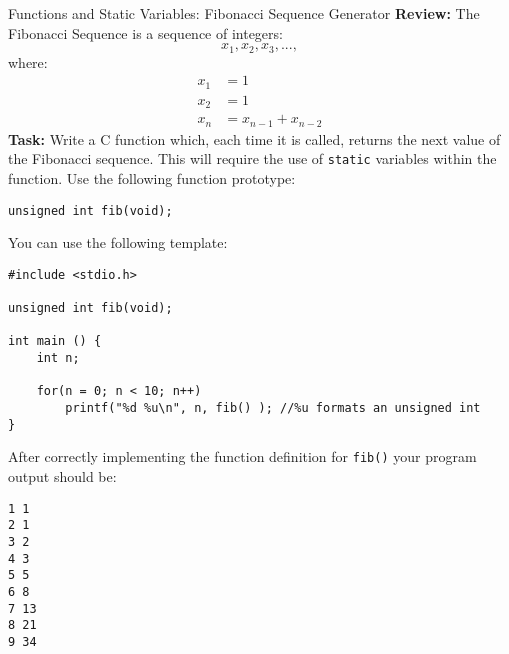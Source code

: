 \documentclass{lab}
\begin{document}
\pagebreak
\begin{task}{Functions and Static Variables: Fibonacci Sequence Generator}{}
\textbf{Review:} The Fibonacci Sequence is a sequence of integers:
\begin{equation*}
x_1, x_2, x_3, ..., 
\end{equation*}
where:
\begin{align*}
x_1 &= 1\\
x_2 &= 1\\
x_n &= x_{n-1} + x_{n-2}
\end{align*}
\textbf{Task:} Write a C function which, each time it is called, returns the next value of the Fibonacci sequence. This will require the use of \texttt{static} variables within the function. Use the following function prototype:
\begin{lstlisting}[style=CStyle]
unsigned int fib(void);
\end{lstlisting}

You can use the following template:
\begin{lstlisting}[style=CStyle]
#include <stdio.h>

unsigned int fib(void);

int main () {
	int n;
	
	for(n = 0; n < 10; n++)
		printf("%d %u\n", n, fib() ); //%u formats an unsigned int
} 
\end{lstlisting}

After correctly implementing the function definition for \texttt{fib()} your program output should be:
\begin{lstlisting}[style=pseudo]
1 1
2 1
3 2
4 3
5 5
6 8
7 13
8 21
9 34
\end{lstlisting}
\end{task}
\end{document}
